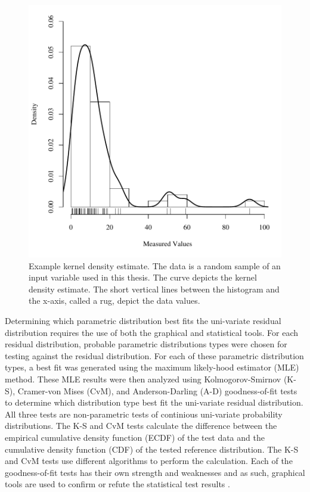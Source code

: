 \begin{linenumbers}
\begin{figure}[htbp]
\centering
	\includegraphics[width=6in]{"Figures/Example KDE"}
	\caption[Example kernel density estimate.]{Example kernel density estimate.  The data is a random sample of an input variable used in this thesis.  The curve depicts the kernel density estimate.  The short vertical lines between the histogram and the x-axis, called a rug, depict the data values.}
	\label{fig:ExampleDistAnalysis}
\end{figure}

Determining which parametric distribution best fits the uni-variate residual distribution requires the use of both the graphical and statistical tools.  For each residual distribution, probable parametric distributions types were chosen for testing against the residual distribution.  For each of these parametric distribution types, a best fit was generated using the maximum likely-hood estimator  (MLE) method.  These MLE results were then analyzed using Kolmogorov-Smirnov (K-S),  Cramer-von Mises (CvM), and Anderson-Darling (A-D) goodness-of-fit tests to determine which distribution type best fit the uni-variate residual distribution.  All three tests are non-parametric tests of continious uni-variate probability distributions.  The K-S and CvM tests calculate the difference between the empirical cumulative density function (ECDF) of the test data and the cumulative density function (CDF) of the tested reference distribution.  The K-S and CvM tests use different algorithms to perform the calculation.  Each of the goodness-of-fit tests has their own strength and weaknesses and as such, graphical tools are used to confirm or refute the statistical test results \parencite{delignette2014, venables2002, DAgostino1986}.


\end{linenumbers}
